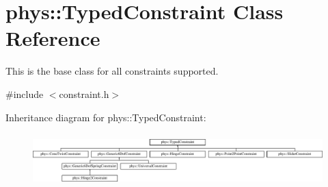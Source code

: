 \hypertarget{classphys_1_1TypedConstraint}{
\section{phys::TypedConstraint Class Reference}
\label{d1/d17/classphys_1_1TypedConstraint}
}


This is the base class for all constraints supported.  




{\ttfamily \#include $<$constraint.h$>$}

Inheritance diagram for phys::TypedConstraint:\begin{figure}[H]
\begin{center}
\leavevmode
\includegraphics[height=2.045662cm]{d1/d17/classphys_1_1TypedConstraint}
\end{center}
\end{figure}
